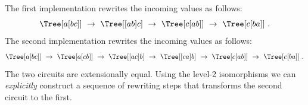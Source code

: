 \documentclass{article}
\begin{document}
\begin{code}%
\>[0]\AgdaSpace{}%
\AgdaSpace{}%
\AgdaSymbol{:}\AgdaSpace{}%
\AgdaSymbol{\{}\AgdaSpace{}%
\AgdaSpace{}%
\AgdaSpace{}%
\AgdaSymbol{:}\AgdaSpace{}%
\AgdaSymbol{\}}\AgdaSpace{}%
\AgdaSpace{}%
\AgdaSpace{}%
\AgdaSpace{}%
\AgdaSymbol{(}\AgdaSpace{}%
\AgdaSpace{}%
\AgdaSymbol{)}\AgdaSpace{}%
\AgdaSpace{}%
\AgdaSpace{}%
\AgdaSpace{}%
\AgdaSymbol{(}\AgdaSpace{}%
\AgdaSpace{}%
\AgdaSymbol{)}\<%
\\
\>[0]\AgdaSpace{}%
\AgdaSymbol{=}\AgdaSpace{}%
\AgdaSpace{}%
\AgdaSpace{}%
\AgdaSpace{}%
\AgdaSpace{}%
\AgdaSymbol{(}\AgdaSpace{}%
\AgdaSpace{}%
\AgdaSymbol{)}\<%
\\
%
\\[\AgdaEmptyExtraSkip]%
\>[0]\AgdaSpace{}%
\AgdaSymbol{=}%
\>[52I]\AgdaSymbol{(}\AgdaSpace{}%
\AgdaSpace{}%
\AgdaSymbol{)}\AgdaSpace{}%
\<%
\\
\>[.]\<[52I]%
\>[11]\AgdaSpace{}%
\<%
\\
%
\>[11]\AgdaSymbol{(}\AgdaSpace{}%
\AgdaSpace{}%
\AgdaSymbol{)}\AgdaSpace{}%
\<%
\\
%
\>[11]\AgdaSpace{}%
\<%
\\
%
\>[11]\AgdaSymbol{(}\AgdaSpace{}%
\AgdaSpace{}%
\AgdaSymbol{)}\<%
\end{code}

\noindent The first implementation rewrites the incoming values as follows:
\[
\Tree [ {\small a} [ {\small b} {\small c} ] ] ~\to~
\Tree [ [ {\small a} {\small b} ] {\small c} ] ~\to~
\Tree [ {\small c} [ {\small a} {\small b} ] ] ~\to~
\Tree [ {\small c} [ {\small b} {\small a} ] ] ~.
\]
\noindent
The second implementation rewrites the incoming values as follows:
\[
\Tree [ {\small a} [ {\small b} {\small c} ] ] ~\to~
\Tree [ {\small a} [ {\small c} {\small b} ] ] ~\to~
\Tree [ [ {\small a} {\small c} ] {\small b} ] ~\to~
\Tree [ [ {\small c} {\small a} ] {\small b} ] ~\to~
\Tree [ {\small c} [ {\small a} {\small b} ] ] ~\to~
\Tree [ {\small c} [ {\small b} {\small a} ] ] ~.
\]
\noindent The two circuits are extensionally equal. Using the level-2
isomorphisms we can \emph{explicitly} construct a sequence of
rewriting steps that transforms the second circuit to the first.  
\end{document}

